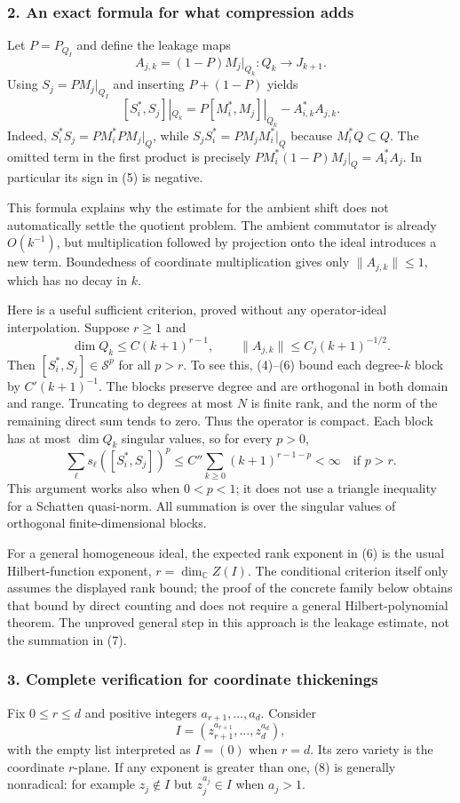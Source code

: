 \documentclass[11pt]{article}
\begin{document}
\subsubsection{2. An exact formula for what compression adds}
Let $P=P_{Q_I}$ and define the leakage maps
\[
 A_{j,k}=(1-P)M_j|_{Q_k}:Q_k\longrightarrow J_{k+1}.
\]
Using $S_j=PM_j|_{Q_I}$ and inserting $P+(1-P)$ yields
\[
 [S_i^*,S_j]|_{Q_k}
 =P[M_i^*,M_j]|_{Q_k}-A_{i,k}^*A_{j,k}.                    \tag{5}
\]
Indeed, $S_i^*S_j=PM_i^*PM_j|_Q$, while $S_jS_i^*=PM_jM_i^*|_Q$ because $M_i^*Q\subset Q$. The omitted term in the first product is precisely $PM_i^*(1-P)M_j|_Q=A_i^*A_j$. In particular its sign in (5) is negative.

This formula explains why the estimate for the ambient shift does not automatically settle the quotient problem. The ambient commutator is already $O(k^{-1})$, but multiplication followed by projection onto the ideal introduces a new term. Boundedness of coordinate multiplication gives only $\|A_{j,k}\|\leq1$, which has no decay in $k$.

Here is a useful sufficient criterion, proved without any operator-ideal interpolation. Suppose $r\geq1$ and
\[
 \dim Q_k\leq C(k+1)^{r-1},\qquad
 \|A_{j,k}\|\leq C_j(k+1)^{-1/2}.                          \tag{6}
\]
Then $[S_i^*,S_j]\in\mathcal S^p$ for all $p>r$. To see this, (4)--(6) bound each degree-$k$ block by $C'(k+1)^{-1}$. The blocks preserve degree and are orthogonal in both domain and range. Truncating to degrees at most $N$ is finite rank, and the norm of the remaining direct sum tends to zero. Thus the operator is compact. Each block has at most $\dim Q_k$ singular values, so for every $p>0$,
\[
 \sum_{\ell}s_\ell([S_i^*,S_j])^p
 \leq C''\sum_{k\geq0}(k+1)^{r-1-p}<\infty
 \quad\text{if }p>r.                                    \tag{7}
\]
This argument works also when $0<p<1$; it does not use a triangle inequality for a Schatten quasi-norm. All summation is over the singular values of orthogonal finite-dimensional blocks.

For a general homogeneous ideal, the expected rank exponent in (6) is the usual Hilbert-function exponent, $r=\dim_{\mathbb C}Z(I)$. The conditional criterion itself only assumes the displayed rank bound; the proof of the concrete family below obtains that bound by direct counting and does not require a general Hilbert-polynomial theorem. The unproved general step in this approach is the leakage estimate, not the summation in (7).

\subsubsection{3. Complete verification for coordinate thickenings}
Fix $0\leq r\leq d$ and positive integers $a_{r+1},\ldots,a_d$. Consider
\[
 I=(z_{r+1}^{a_{r+1}},\ldots,z_d^{a_d}),                   \tag{8}
\]
with the empty list interpreted as $I=(0)$ when $r=d$. Its zero variety is the coordinate $r$-plane. If any exponent is greater than one, (8) is generally nonradical: for example $z_j\notin I$ but $z_j^{a_j}\in I$ when $a_j>1$.
\end{document}
